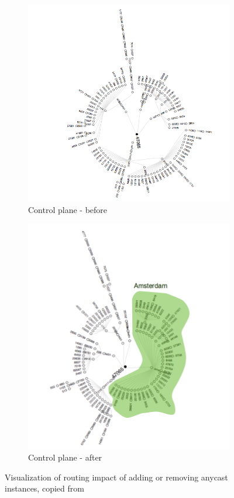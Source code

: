 \begin{figure}[!ht]
	\begin{subfigure}[b]{0.5\linewidth}
		\centering
		\includegraphics[width=\linewidth]{img/beforeAmestC.png}
		\caption{Control plane - before}
		\label{fig:ricardo-control-before}
	\end{subfigure}
	\begin{subfigure}[b]{0.5\linewidth}
		\centering
		\includegraphics[width=\linewidth]{img/afterAmestC.png}
		\caption{Control plane - after}
		\label{fig:ricardo-control-after}
	\end{subfigure}
	\caption{Visualization of routing impact of adding or removing anycast instances, copied from \cite{github-anycast}}
	\label{fig:ch02:ricardo}		
\end{figure}

